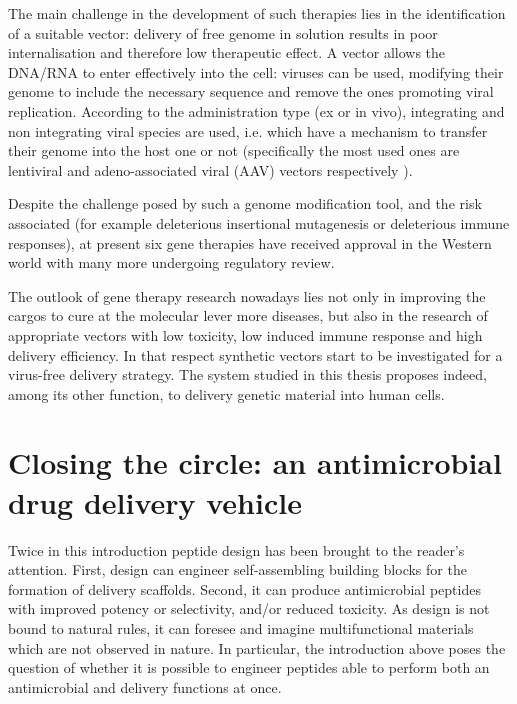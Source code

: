 The main challenge in the development of such therapies lies in the identification of a suitable vector: delivery of free genome in solution results in poor internalisation and therefore low therapeutic effect. A vector allows the DNA/RNA to enter effectively into the cell: viruses can be used, modifying their genome to include the necessary sequence and remove the ones promoting viral replication.
%
According to the administration type (ex or in vivo), integrating and non integrating viral species are used, i.e. which have a mechanism to transfer their genome into the host one or not (specifically the most used ones are lentiviral and adeno-associated viral (AAV) vectors respectively \cite{Naldini2011,Mingozzi2011}).

Despite the challenge posed by such a genome modification tool, and the risk associated (for example deleterious insertional mutagenesis or deleterious immune responses), at present six gene therapies have received approval in the Western world \cite{Anguela2019} with many more undergoing regulatory review. 

The outlook of gene therapy research nowadays lies not only in improving the cargos to cure at the molecular lever more diseases, but also in the research of appropriate vectors with low toxicity, low induced immune response and high delivery efficiency. In that respect synthetic vectors start to be investigated for a virus-free delivery strategy. The system studied in this thesis proposes indeed, among its other function, to delivery genetic material into human cells.


\section{Closing the circle: an antimicrobial drug delivery vehicle}

Twice in this introduction peptide design has been brought to the reader's attention. First, design can engineer self-assembling building blocks for the formation of delivery scaffolds. Second, it can produce antimicrobial peptides with improved potency or selectivity, and/or reduced toxicity. As design is not bound to natural rules, it can foresee and imagine multifunctional materials which are not observed in nature. In particular, the introduction above poses the question of whether it is possible to engineer peptides able to perform both an antimicrobial and delivery functions at once.

